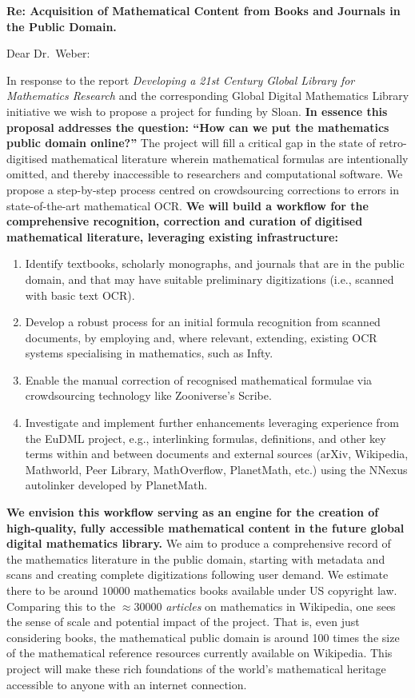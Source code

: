 \documentclass[10pt,letterpaper]{article}
\begin{document}
\thispagestyle{empty}

\noindent\textbf{Re: \quad Acquisition of Mathematical Content from Books and Journals in the Public Domain.}

\bigskip

\noindent Dear Dr.~Weber:

\bigskip

In response to the report \emph{Developing a 21st Century Global
  Library for Mathematics Research} and the corresponding Global
Digital Mathematics Library initiative we wish to propose a project
for funding by Sloan.  \textbf{In essence this proposal addresses the
  question: ``How can we put the mathematics public domain online?''}
The project will fill a critical gap in the state of retro-digitised
mathematical literature wherein mathematical formulas are
intentionally omitted, and thereby inaccessible to researchers and
computational software.  We propose a step-by-step process centred on
crowdsourcing corrections to errors in state-of-the-art mathematical
OCR.  \textbf{We will build a workflow for the comprehensive
  recognition, correction and curation of digitised mathematical
  literature, leveraging existing infrastructure:}
\begin{enumerate}
\item Identify textbooks, scholarly monographs, and journals that are
  in the public domain, and that may have suitable preliminary
  digitizations (i.e., scanned with basic text OCR).
\item Develop a robust process for an initial formula recognition from scanned 
documents, by employing and, where relevant, extending, existing OCR systems 
specialising in mathematics, such as {\sf Infty}.
\item Enable 
the manual correction of recognised mathematical formulae via crowdsourcing 
technology like Zooniverse's {\sf Scribe}.
\item Investigate and implement further enhancements leveraging
  experience from the EuDML project, e.g., interlinking formulas,
  definitions, and other key terms within and between documents and
  external sources (arXiv, Wikipedia, Mathworld, Peer Library,
  MathOverflow, PlanetMath, etc.) using the {\sf NNexus} autolinker
  developed by PlanetMath.
\end{enumerate}
\textbf{We envision this workflow serving as an engine for the
  creation of high-quality, fully accessible mathematical content in
  the future global digital mathematics library.}  We aim to produce a
comprehensive record of the mathematics literature in the public
domain, starting with metadata and scans and creating complete
digitizations following user demand.  We estimate there to be around
$10000$ mathematics books available under US copyright law.  Comparing
this to the $\approx$30000 \emph{articles} on mathematics in
Wikipedia, one sees the sense of scale and potential impact of the
project.  That is, even just considering books, the mathematical
public domain is around 100 times the size of the mathematical
reference resources currently available on Wikipedia.  This project
will make these rich foundations of the world's mathematical heritage
accessible to anyone with an internet connection.
\end{document}
